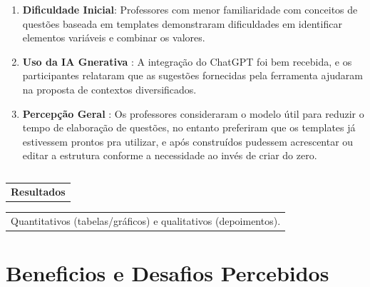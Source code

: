 \begin{enumerate}
    \item \textbf{Dificuldade Inicial}: Professores com menor familiaridade com conceitos de questões baseada em templates demonstraram dificuldades em identificar elementos variáveis e combinar os valores.
    \item \textbf{Uso da IA Gnerativa} : A integração do ChatGPT foi bem recebida, e os participantes relataram que as sugestões fornecidas pela ferramenta ajudaram na proposta de contextos diversificados.
    \item \textbf{Percepção Geral} : Os professores consideraram o modelo útil para reduzir o tempo de elaboração de questões, no entanto preferiram que os templates já estivessem prontos pra utilizar, e após construídos pudessem acrescentar ou editar a estrutura conforme a necessidade ao invés de criar do zero.
\end{enumerate}


\begin{table}
\centering

\begin{tabular}{l}
 \\

\end{tabular}

\end{table}

\begin{table}
\centering

\begin{tabular}{l}
\textbf{Resultados} \\

\end{tabular}

\end{table}

\begin{table}
\centering

\begin{tabular}{l}
Quantitativos (tabelas/gráficos) e qualitativos (depoimentos). \\

\end{tabular}

\end{table}

 
\section{Beneficios e Desafios Percebidos} 

